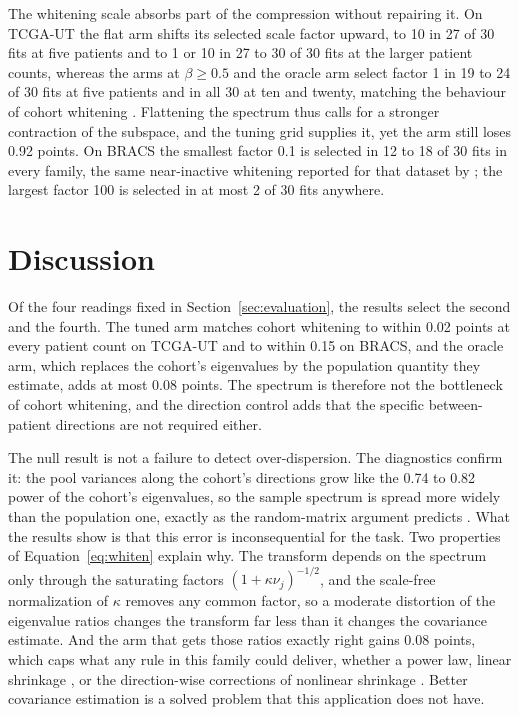 The whitening scale absorbs part of the compression without repairing it. On TCGA-UT the flat arm shifts its selected scale factor upward, to 10 in 27 of 30 fits at five patients and to 1 or 10 in 27 to 30 of 30 fits at the larger patient counts, whereas the arms at $\beta\geq0.5$ and the oracle arm select factor 1 in 19 to 24 of 30 fits at five patients and in all 30 at ten and twenty, matching the behaviour of cohort whitening \citep{queisler2026patientDirections}. Flattening the spectrum thus calls for a stronger contraction of the subspace, and the tuning grid supplies it, yet the arm still loses 0.92 points. On BRACS the smallest factor 0.1 is selected in 12 to 18 of 30 fits in every family, the same near-inactive whitening reported for that dataset by \citet{queisler2026bracsMechanism}; the largest factor 100 is selected in at most 2 of 30 fits anywhere.

\section{Discussion}
\label{sec:discussion}
Of the four readings fixed in Section~\ref{sec:evaluation}, the results select the second and the fourth. The tuned arm matches cohort whitening to within 0.02 points at every patient count on TCGA-UT and to within 0.15 on BRACS, and the oracle arm, which replaces the cohort's eigenvalues by the population quantity they estimate, adds at most 0.08 points. The spectrum is therefore not the bottleneck of cohort whitening, and the direction control adds that the specific between-patient directions are not required either.

The null result is not a failure to detect over-dispersion. The diagnostics confirm it: the pool variances along the cohort's directions grow like the 0.74 to 0.82 power of the cohort's eigenvalues, so the sample spectrum is spread more widely than the population one, exactly as the random-matrix argument predicts \citep{marchenko1967,johnstone2001}. What the results show is that this error is inconsequential for the task. Two properties of Equation~\ref{eq:whiten} explain why. The transform depends on the spectrum only through the saturating factors $(1+\kappa\nu_j)^{-1/2}$, and the scale-free normalization of $\kappa$ removes any common factor, so a moderate distortion of the eigenvalue ratios changes the transform far less than it changes the covariance estimate. And the arm that gets those ratios exactly right gains 0.08 points, which caps what any rule in this family could deliver, whether a power law, linear shrinkage \citep{ledoit2004wellconditioned}, or the direction-wise corrections of nonlinear shrinkage \citep{ledoit2020analytical}. Better covariance estimation is a solved problem that this application does not have.

